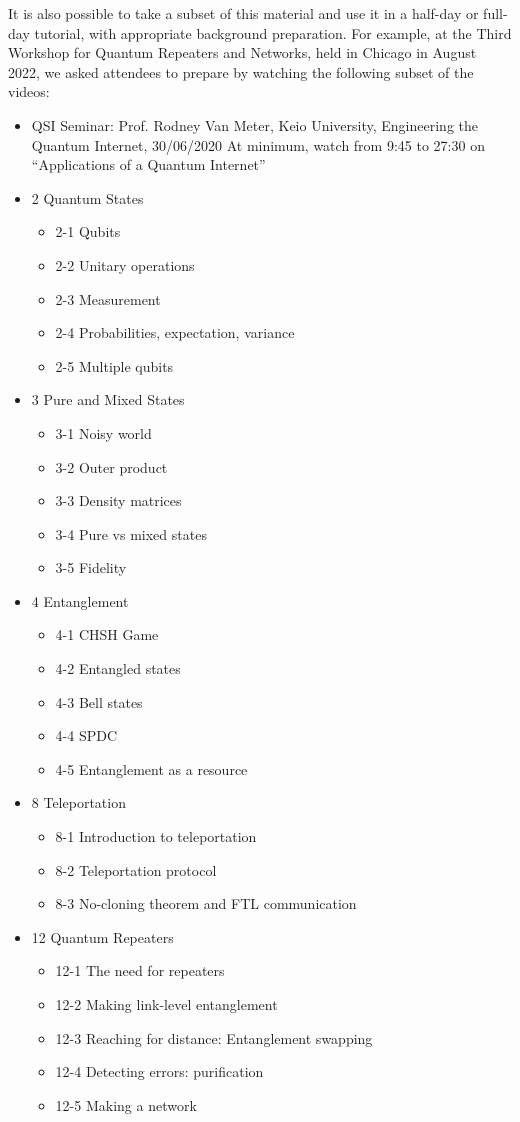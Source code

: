 It is also possible to take a subset of this material and use it in a half-day or full-day tutorial, with appropriate background preparation.  For example, at the Third Workshop for Quantum Repeaters and Networks, held in Chicago in August 2022, we asked attendees to prepare by watching the following subset of the videos:
\begin{itemize}
\item QSI Seminar: Prof. Rodney Van Meter, Keio University, Engineering the Quantum Internet, 30/06/2020
At minimum, watch from 9:45 to 27:30 on 
“Applications of a Quantum Internet”
\item 2 Quantum States
\begin{itemize}
\item 2-1 Qubits
\item 2-2 Unitary operations				
\item 2-3 Measurement
\item 2-4 Probabilities, expectation, variance
\item 2-5 Multiple qubits
\end{itemize}
\item 3 Pure and Mixed States
\begin{itemize}
\item 3-1 Noisy world
\item 3-2 Outer product
\item 3-3 Density matrices
\item 3-4 Pure vs mixed states
\item 3-5 Fidelity
\end{itemize}
\item 4 Entanglement
\begin{itemize}
\item 4-1 CHSH Game
\item 4-2 Entangled states
\item 4-3 Bell states
\item 4-4 SPDC
\item 4-5 Entanglement as a resource
\end{itemize}
\item 8 Teleportation
\begin{itemize}
\item 8-1 Introduction to teleportation
\item 8-2 Teleportation protocol
\item 8-3 No-cloning theorem and FTL communication
\end{itemize}
\item 12 Quantum Repeaters
\begin{itemize}
\item 12-1 The need for repeaters
\item 12-2 Making link-level entanglement
\item 12-3 Reaching for distance: Entanglement swapping
\item 12-4 Detecting errors: purification
\item 12-5 Making a network 
\end{itemize}
\end{itemize}

